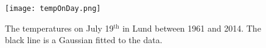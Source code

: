 \begin{figure}[ht]
\begin{center}
\texttt{[image: tempOnDay.png]}
\caption{\label{fig:tempOnDay} The temperatures on July 19$^{\text{th}}$ in Lund between 1961 and 2014. The black line is a Gaussian fitted to the data.}
\end{center}
\end{figure}

\begin{comment}
Midsummer is celebrated in Sweden on a day between June 19 and June 26. Historically, beginning in the 4th century, Midsummer was celebrated on the 24th of June. Therefore, June 23 is chosen for the comparison since we celebrate on midsummers eve. In Sweden we now celebrate on the Friday between June 19 and June 26. The weather on midsummers eve is compared to the weather on christmas eve, both using the dataset from Uppsala, seen in Fig. \ref{fig:midsummerchristmas}.

\begin{figure}[ht]
\centering
\subfloat[Midsummers eve]{\label{fig:midsummer}\texttt{[image: tempOnDayNumber.png]}} 
\subfloat[Christmas eve]{\label{fig:christmas}\texttt{[image: tempOnDay.png]}}\\
\caption{The temperatures on July 19$^{th}$ in Uppsala for the years between 1722 and 2013 in (a). The black line is a Gaussian fitted to the histogram.}
\label{fig:midsummerchristmas}
\end{figure}
\end{comment}


